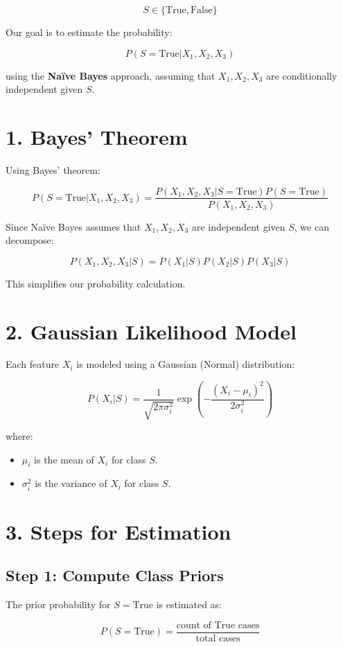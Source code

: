\documentclass{article}
\begin{document}
\[
S \in \{\text{True}, \text{False}\}
\]

Our goal is to estimate the probability:

\[
P(S = \text{True} | X_1, X_2, X_3)
\]

using the \textbf{Naïve Bayes} approach, assuming that \( X_1, X_2, X_3 \) are conditionally independent given \( S \).

\section{1. Bayes' Theorem}
Using Bayes' theorem:

\[
P(S = \text{True} | X_1, X_2, X_3) = \frac{P(X_1, X_2, X_3 | S = \text{True}) P(S = \text{True})}{P(X_1, X_2, X_3)}
\]

Since Naïve Bayes assumes that \( X_1, X_2, X_3 \) are independent given \( S \), we can decompose:

\[
P(X_1, X_2, X_3 | S) = P(X_1 | S) P(X_2 | S) P(X_3 | S)
\]

This simplifies our probability calculation.

\section{2. Gaussian Likelihood Model}
Each feature \( X_i \) is modeled using a Gaussian (Normal) distribution:

\[
P(X_i | S) = \frac{1}{\sqrt{2 \pi \sigma_i^2}} \exp\left(-\frac{(X_i - \mu_i)^2}{2 \sigma_i^2} \right)
\]

where:
\begin{itemize}
    \item \( \mu_i \) is the mean of \( X_i \) for class \( S \).
    \item \( \sigma_i^2 \) is the variance of \( X_i \) for class \( S \).
\end{itemize}

\section{3. Steps for Estimation}
\subsection{Step 1: Compute Class Priors}
The prior probability for \( S = \text{True} \) is estimated as:

\[
P(S = \text{True}) = \frac{\text{count of True cases}}{\text{total cases}}
\]
\end{document}
